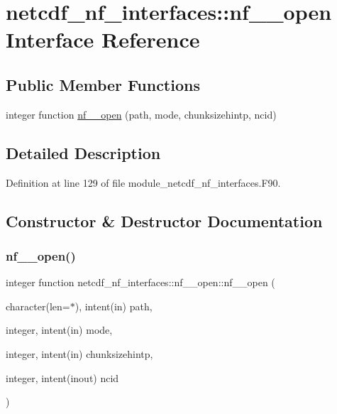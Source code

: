 \hypertarget{interfacenetcdf__nf__interfaces_1_1nf____open}{}\section{netcdf\+\_\+nf\+\_\+interfaces\+:\+:nf\+\_\+\+\_\+open Interface Reference}
\label{interfacenetcdf__nf__interfaces_1_1nf____open}
\subsection*{Public Member Functions}
\begin{DoxyCompactItemize}
\item 
integer function \hyperlink{interfacenetcdf__nf__interfaces_1_1nf____open_a36ca073060b0024155877e78fa77082f}{nf\+\_\+\+\_\+open} (path, mode, chunksizehintp, ncid)
\end{DoxyCompactItemize}


\subsection{Detailed Description}


Definition at line 129 of file module\+\_\+netcdf\+\_\+nf\+\_\+interfaces.\+F90.



\subsection{Constructor \& Destructor Documentation}
\mbox{\label{interfacenetcdf__nf__interfaces_1_1nf____open_a36ca073060b0024155877e78fa77082f}} 
\subsubsection{\texorpdfstring{nf\+\_\+\+\_\+open()}{nf\_\_open()}}
{\footnotesize\ttfamily integer function netcdf\+\_\+nf\+\_\+interfaces\+::nf\+\_\+\+\_\+open\+::nf\+\_\+\+\_\+open (\begin{DoxyParamCaption}\item[{character(len=$\ast$), intent(in)}]{path,  }\item[{integer, intent(in)}]{mode,  }\item[{integer, intent(in)}]{chunksizehintp,  }\item[{integer, intent(inout)}]{ncid }\end{DoxyParamCaption})}



